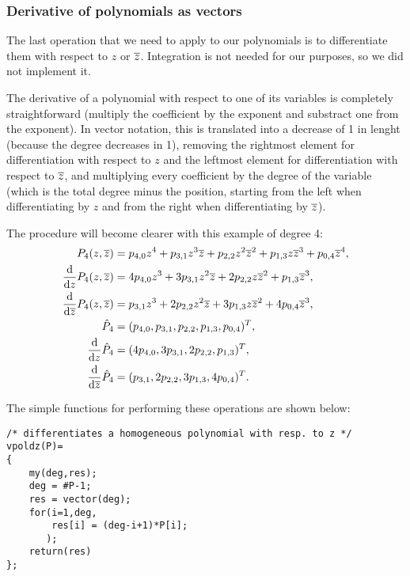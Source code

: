 \subsubsection{Derivative of polynomials as vectors}

The last operation that we need to apply to our polynomials is to differentiate them with respect to $z$ or $\overline{z}$. Integration is not needed for our purposes, so we did not implement it.

The derivative of a polynomial with respect to one of its variables is completely straightforward (multiply the coefficient by the exponent and substract one from the exponent). In vector notation, this is translated into a decrease of 1 in lenght (because the degree decreases in 1), removing the rightmost element for differentiation with respect to $z$ and the leftmost element for differentiation with respect to $\overline{z}$, and multiplying every coefficient by the degree of the variable (which is the total degree minus the position, starting from the left when differentiating by $z$ and from the right when differentiating by $\overline{z}$).

The procedure will become clearer with this example of degree 4:
\begin{align*}
P_4(z,\overline{z}) &= p_{4,0}z^4+p_{3,1}z^3\overline{z}+p_{2,2}z^2\overline{z}^2+p_{1,3}z\overline{z}^3+p_{0,4}\overline{z}^4,\\
\frac{\mathrm{d}}{\mathrm{d} z} P_4(z,\overline{z}) &= 4p_{4,0}z^3+3p_{3,1}z^2\overline{z}+2p_{2,2}z\overline{z}^2+p_{1,3}\overline{z}^3,\\
\frac{\mathrm{d}}{\mathrm{d} \overline{z}} P_4(z,\overline{z}) &= p_{3,1}z^3+2p_{2,2}z^2\overline{z}+3p_{1,3}z\overline{z}^2+4p_{0,4}\overline{z}^3,\\
\hat P_4 &= (p_{4,0},p_{3,1},p_{2,2},p_{1,3},p_{0,4})^T,\\
\frac{\mathrm{d}}{\mathrm{d} z} \hat P_4 &= (4p_{4,0},3p_{3,1},2p_{2,2},p_{1,3})^T,\\
\frac{\mathrm{d}}{\mathrm{d} \overline{z}} \hat P_4 &= (p_{3,1},2p_{2,2},3p_{1,3},4p_{0,4})^T.
\end{align*}

The simple functions for performing these operations are shown below:
\begin{center}
\begin{minipage}{0.8\textwidth}
\begin{lstlisting}[caption={Function for differentiating by $z$.}]
/* differentiates a homogeneous polynomial with resp. to z */
vpoldz(P)=
{
    my(deg,res);
    deg = #P-1;
    res = vector(deg);
    for(i=1,deg,
        res[i] = (deg-i+1)*P[i];
       );
    return(res)
};
\end{lstlisting}
\end{minipage}
\end{center}

